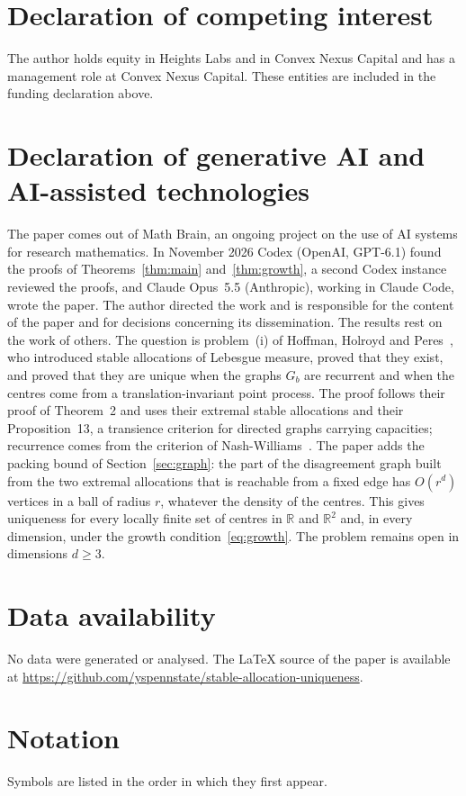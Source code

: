 \documentclass[11pt]{amsart}
\theoremstyle{remark}
\numberwithin{equation}{section}
\newcommand{\R}{\mathbb{R}}
\begin{document}
\section*{Declaration of competing interest}
The author holds equity in Heights Labs and in Convex Nexus Capital and
has a management role at Convex Nexus Capital. These entities are included
in the funding declaration above.

\section*{Declaration of generative AI and AI-assisted technologies}
The paper comes out of Math Brain, an ongoing project on the use of AI systems for research mathematics. In November 2026 Codex (OpenAI, GPT-6.1) found the proofs of Theorems~\ref{thm:main} and~\ref{thm:growth}, a second Codex instance reviewed the proofs, and Claude Opus~5.5 (Anthropic), working in Claude Code, wrote the paper. The author directed the work and is responsible for the content of the paper and for decisions concerning its dissemination. The results rest on the work of others. The question is problem~(i) of Hoffman, Holroyd and Peres~\cite[Section~7]{HHP}, who introduced stable allocations of Lebesgue measure, proved that they exist, and proved that they are unique when the graphs $G_b$ are recurrent and when the centres come from a translation-invariant point process. The proof follows their proof of Theorem~2 and uses their extremal stable allocations and their Proposition~13, a transience criterion for directed graphs carrying capacities; recurrence comes from the criterion of Nash-Williams~\cite{NW}. The paper adds the packing bound of Section~\ref{sec:graph}: the part of the disagreement graph built from the two extremal allocations that is reachable from a fixed edge has $O(r^d)$ vertices in a ball of radius $r$, whatever the density of the centres. This gives uniqueness for every locally finite set of centres in $\R$ and $\R^2$ and, in every dimension, under the growth condition~\eqref{eq:growth}. The problem remains open in dimensions $d\ge3$.

\section*{Data availability}
No data were generated or analysed. The \LaTeX{} source of the paper is available at \url{https://github.com/yspennstate/stable-allocation-uniqueness}.

\appendix
\section{Notation}\label{app:notation}
Symbols are listed in the order in which they first appear.
\end{document}
